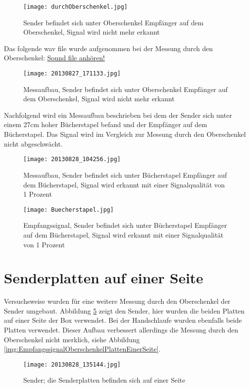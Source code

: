 \documentclass[10pt]{scrartcl}
\begin{document}
\begin{figure}[h!]
	\centering
	\texttt{[image: durchOberschenkel.jpg]}
	\caption{Sender befindet sich unter Oberschenkel Empfänger auf dem Oberschenkel, Signal wird nicht mehr erkannt}
	\label{img:Oberschenkel}
\end{figure}

\clearpage
\newpage

Das folgende wav file wurde aufgenommen bei der Messung durch den Oberschenkel:
\href{run:Appendix/1.wav}{Sound file anhören!}

\begin{figure}[h!]
	\centering
	\texttt{[image: 20130827\_171133.jpg]}
	\caption{Messaufbau, Sender befindet sich unter Oberschenkel Empfänger auf dem Oberschenkel, Signal wird nicht mehr erkannt}
	\label{img:MessaufbauOberschenkel}
\end{figure}

\clearpage
\newpage
Nachfolgend wird ein Messaufbau beschrieben bei dem der Sender sich unter einem 27cm hoher Bücherstapel befand und der Empfänger auf dem Bücherstapel. Das Signal wird im Vergleich zur Messung durch den Oberschenkel nicht abgeschwächt.

\begin{figure}[h!]
	\centering
	\texttt{[image: 20130828\_104256.jpg]}
	\caption{Messaufbau, Sender befindet sich unter Bücherstapel Empfänger auf dem Bücherstapel, Signal wird erkannt mit einer Signalqualität von 1 Prozent}
	\label{img:MessaufbauBücherstapel}
\end{figure}

\begin{figure}[h!]
	\centering
	\texttt{[image: Buecherstapel.jpg]}
	\caption{Empfangssignal, Sender befindet sich unter Bücherstapel Empfänger auf dem Bücherstapel, Signal wird erkannt mit einer Signalqualität von 1 Prozent}
	\label{img:EmpfangssignalBücherstapel}
\end{figure}

\clearpage
\newpage
\section{Senderplatten auf einer Seite}
Versuchsweise wurden für eine weitere Messung durch den Oberschenkel der Sender umgebaut. Abbildung \ref{img:SenderPlattenaufbau} zeigt den Sender, hier wurden die beiden Platten auf einer Seite der Box verwendet. Bei der Handschlaufe wurden ebenfalls beide Platten verwendet. Dieser Aufbau verbessert allerdings die Messung durch den Oberschenkel nicht merklich, siehe Abbildung \ref{img:EmpfangssignalOberschenkelPlattenEinerSeite}.
\begin{figure}[h!]
	\centering
	\texttt{[image: 20130828\_135144.jpg]}
	\caption{Sender; die Senderplatten befinden sich auf einer Seite}
	\label{img:SenderPlattenaufbau}
\end{figure}
\end{document}
